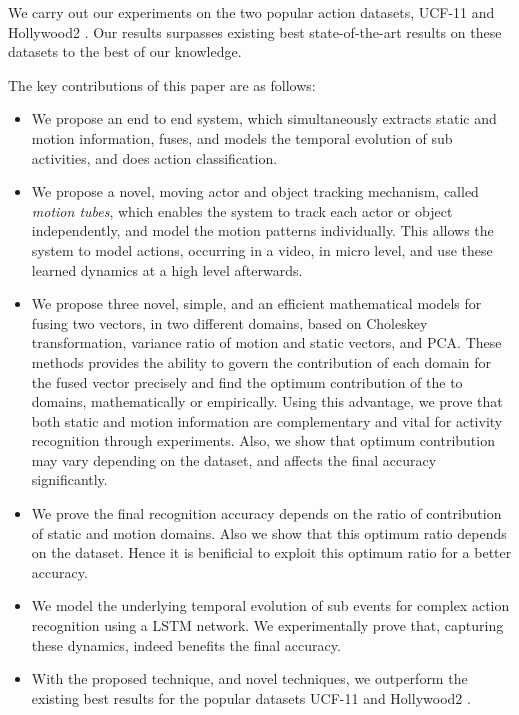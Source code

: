 We carry out our experiments on the two popular action datasets, UCF-11 \cite{liu2009recognizing}
and Hollywood2 \cite{marszalek2009actions}. Our results surpasses existing best state-of-the-art
results on these datasets to the best of our knowledge.

The key contributions of this paper are as follows:

 \begin{itemize}
  \item We propose an end to end system, which simultaneously extracts static and motion information, fuses, and models the 
temporal evolution of sub activities, and does action classification. 
  \item We propose a novel, moving actor and object tracking mechanism, called \textit{motion tubes},
which enables the system to track each actor or object independently, and model the motion patterns individually. 
This allows the system to model actions, occurring in a video, in micro level, and use these learned dynamics
at a high level afterwards.
 \item We propose three novel, simple, and an efficient mathematical models for fusing two vectors, 
in two different 
domains, based on Choleskey transformation, variance ratio of motion and static vectors, and PCA. These methods provides 
the ability to govern the contribution of each domain
for the fused vector precisely and find the optimum contribution of the to domains, mathematically or empirically. Using this advantage, we prove that
both static and motion information are complementary and vital for activity recognition through experiments. Also, we show that optimum contribution 
may vary depending on the dataset, and affects the final accuracy significantly. 
 \item We prove the final recognition accuracy depends on the ratio of contribution of static and motion domains. Also we show that
 this optimum ratio depends on the dataset. Hence it is benificial to exploit this optimum ratio for a better accuracy. 
  \item We model the underlying 
temporal evolution of sub events for complex action recognition using a LSTM network. We experimentally 
prove that, capturing these dynamics, indeed benefits the final accuracy. 

\item With the proposed technique, and novel techniques,
we outperform the existing best results for the popular datasets UCF-11 \cite{liu2009recognizing}
and Hollywood2 \cite{marszalek2009actions}.
 \end{itemize}




